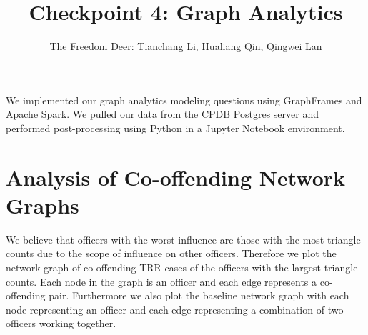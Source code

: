 \documentclass[10pt]{article}
\title{Checkpoint 4: Graph Analytics}
\author{The Freedom Deer: Tianchang Li, Hualiang Qin, Qingwei Lan}
\begin{document}
\maketitle

We implemented our graph analytics modeling questions using GraphFrames and Apache Spark. We pulled our data from the CPDB Postgres server and performed post-processing using Python in a Jupyter Notebook environment.




\section{Analysis of Co-offending Network Graphs}

We believe that officers with the worst influence are those with the most triangle counts due to the scope of influence on other officers. Therefore we plot the network graph of co-offending TRR cases of the officers with the largest triangle counts. Each node in the graph is an officer and each edge represents a co-offending pair. Furthermore we also plot the baseline network graph with each node representing an officer and each edge representing a combination of two officers working together.
\end{document}
